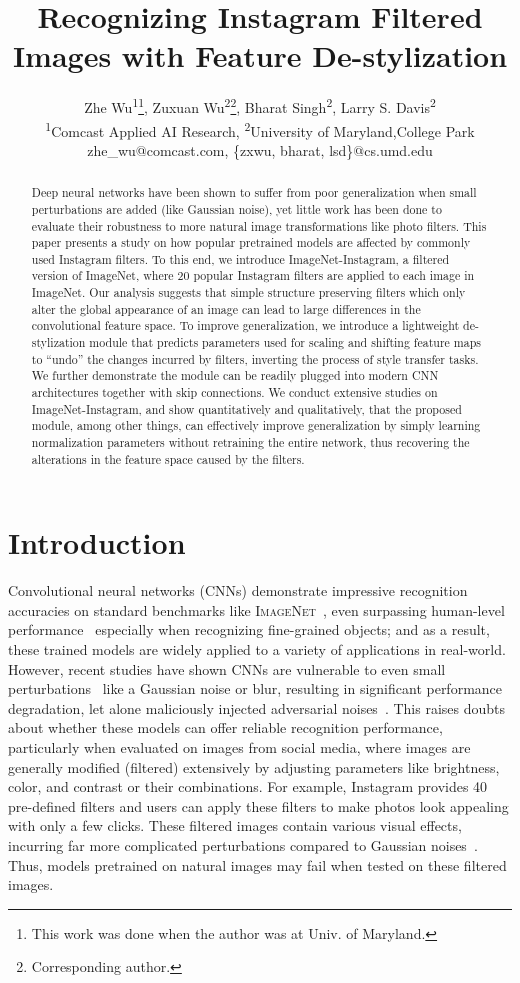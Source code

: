 \documentclass[letterpaper]{article} %
\title{Recognizing Instagram Filtered Images with Feature De-stylization}
\author{Zhe Wu\textsuperscript{\rm 1}\thanks{This work was done when the author was at Univ. of Maryland.},
Zuxuan Wu\textsuperscript{\rm 2}\thanks{Corresponding author.},
Bharat Singh\textsuperscript{\rm 2},
Larry S. Davis\textsuperscript{\rm 2}\\
\textsuperscript{\rm 1}Comcast Applied AI Research, \textsuperscript{\rm 2}University of Maryland,College Park\\ %
zhe\_wu@comcast.com, \{zxwu, bharat, lsd\}@cs.umd.edu%
}
\newcommand{\imagenet}{{\scshape ImageNet}\xspace}
\begin{document}
\maketitle

\begin{abstract}
Deep neural networks have been shown to suffer from poor generalization when small perturbations are added (like Gaussian noise), yet little work has been done to evaluate their robustness to more natural image transformations like photo filters. This paper presents a study on how popular pretrained models are affected by commonly used Instagram filters. To this end, we introduce ImageNet-Instagram, a filtered version of ImageNet, where 20 popular Instagram filters are applied to each image in ImageNet. Our analysis suggests that simple structure preserving filters which only alter the global appearance of an image can lead to large differences in the convolutional feature space. To improve generalization, we introduce a lightweight de-stylization module that predicts parameters used for scaling and shifting feature maps to ``undo'' the changes incurred by filters, inverting the process of style transfer tasks. We further demonstrate the module can be readily plugged into modern CNN architectures together with skip connections. We conduct extensive studies on ImageNet-Instagram, and show quantitatively and qualitatively, that the proposed module, among other things, can effectively improve generalization by simply learning normalization parameters without retraining the entire network, thus recovering the alterations in the feature space caused by the filters.
\end{abstract}

\section{Introduction}
Convolutional neural networks (CNNs) demonstrate impressive recognition accuracies on standard benchmarks like \imagenet~\cite{deng2009imagenet}, even surpassing human-level performance~\cite{he2015delving} especially when recognizing fine-grained objects; and as a result, these trained models are widely applied to a variety of applications in real-world. However, recent studies have shown CNNs are vulnerable to even small perturbations~\cite{hendrycks2018benchmarking} like a Gaussian noise or blur, resulting in significant performance degradation, let alone maliciously injected adversarial noises~\cite{goodfellow2014generative,kurakin2016adversarial}. This raises doubts about whether these models can offer reliable recognition performance, particularly when evaluated on images from social media, where images are generally modified (filtered) extensively by adjusting parameters like brightness, color, and contrast or their combinations. For example, Instagram provides 40 pre-defined filters and users can apply these filters to make photos look appealing with only a few clicks. These filtered images contain various visual effects, incurring far more complicated perturbations compared to Gaussian noises~\cite{hendrycks2018benchmarking,geirhos2018generalisation}. Thus, models pretrained on natural images may fail when tested on these filtered images.
\end{document}
